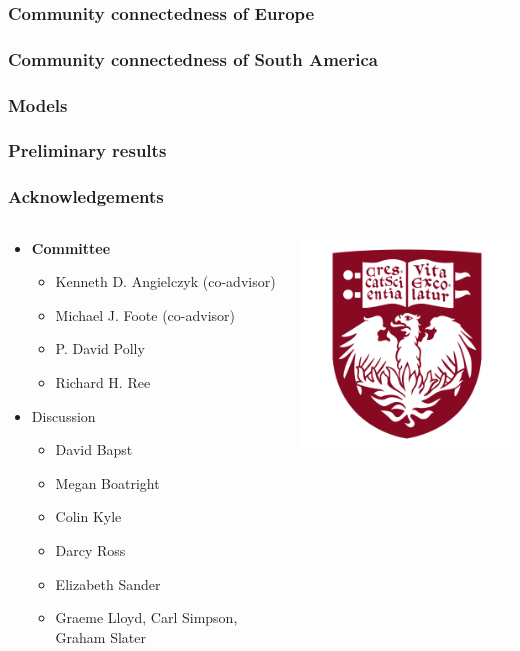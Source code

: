 \documentclass{beamer}
\begin{document}
\begin{frame}
  \frametitle{Community connectedness of Europe}
\end{frame}

\begin{frame}
  \frametitle{Community connectedness of South America}
\end{frame}

\begin{frame}
  \frametitle{Models}
\end{frame}

\begin{frame}
  \frametitle{Preliminary results}
\end{frame}


\begin{frame}
  \frametitle{Acknowledgements}
  \begin{columns}
    \begin{column}{0.5\textwidth}
      \begin{itemize}
        \item \textbf{Committee}
          \begin{itemize}
            \item Kenneth D. Angielczyk (co-advisor)
            \item Michael J. Foote (co-advisor)
            \item P. David Polly
            \item Richard H. Ree
          \end{itemize}
        \item Discussion
          \begin{itemize}
            \item David Bapst
            \item Megan Boatright
            \item Colin Kyle
            \item Darcy Ross
            \item Elizabeth Sander
            \item Graeme Lloyd, Carl Simpson, Graham Slater
          \end{itemize}
      \end{itemize}
    \end{column}
    \begin{column}{0.5\textwidth}
      \includegraphics[height = 0.25\textheight, keepaspectratio = true]{figure/chicago} \\

\end{column}
\end{columns}
\end{frame}
\end{document}
